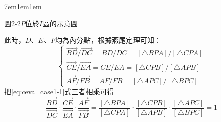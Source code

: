 \documentclass[12pt]{article}
\begin{document}
\begin{mybox}[必要性證明]{7em}{1em}{1em}
\begin{enumerate}[label=Case \arabic*：, itemsep=2em]
\begin{center}
            \vspace{0.5cm}
            \noindent
            \begin{minipage}{\textwidth}
            \centering
            圖2-2\quad $P$位於$I$區的示意圖
            \end{minipage}%
        \end{center}
        此時，$D$、$E$、$F$均為內分點，根據燕尾定理可知：
        \begin{equation}
            \begin{cases}
                \overrightarrow{BD}/\overrightarrow{DC}=BD/DC=\left[\triangle{BPA}\right]/\left[\triangle{CPA}\right]\\
                \overrightarrow{CE}/\overrightarrow{EA}=CE/EA=\left[\triangle{CPB}\right]/\left[\triangle{APB}\right]\\
                \overrightarrow{AF}/\overrightarrow{FB}=AF/FB=\left[\triangle{APC}\right]/\left[\triangle{BPC}\right]
            \end{cases}\label{eq:ceva_case1-1}
        \end{equation}
        把\eqref{eq:ceva_case1-1}式三者相乘可得
        \begin{equation}
            \frac{\overrightarrow{BD}}{\overrightarrow{DC}}
            \cdot\frac{\overrightarrow{CE}}{\overrightarrow{EA}}
            \cdot\frac{\overrightarrow{AF}}{\overrightarrow{FB}}
            =\frac{\left[\triangle{BPA}\right]}{\left[\triangle{CPA}\right]}
            \cdot\frac{\left[\triangle{CPB}\right]}{\left[\triangle{APB}\right]}
            \cdot\frac{\left[\triangle{APC}\right]}{\left[\triangle{BPC}\right]}
            =1\label{eq:ceva_case1-2}
        \end{equation}


\end{enumerate}
\end{mybox}
\end{document}
